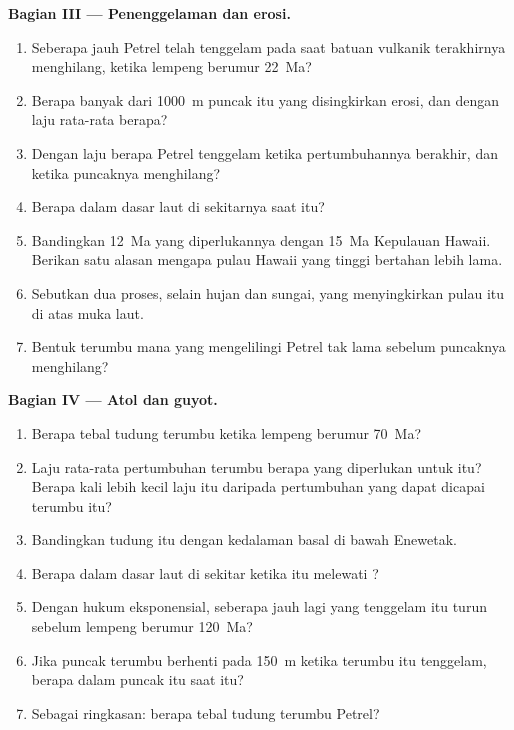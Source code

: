 \begin{problem}
\noindent\textbf{Bagian III --- Penenggelaman dan erosi.}
\begin{enumerate}[resume]
  \item Seberapa jauh Petrel telah tenggelam pada saat batuan vulkanik terakhirnya menghilang, ketika lempeng
        berumur \qty{22}{Ma}?
  \item Berapa banyak dari \qty{1000}{m} puncak itu yang disingkirkan erosi, dan dengan laju rata-rata berapa?
  \item Dengan laju berapa Petrel tenggelam ketika pertumbuhannya berakhir, dan ketika puncaknya menghilang?
  \item Berapa dalam dasar laut di sekitarnya saat itu?
  \item Bandingkan \qty{12}{Ma} yang diperlukannya dengan \qty{15}{Ma} Kepulauan Hawaii. Berikan satu
        alasan mengapa pulau Hawaii yang tinggi bertahan lebih lama.
  \item Sebutkan dua proses, selain hujan dan sungai, yang menyingkirkan pulau itu di atas muka laut.
  \item Bentuk terumbu mana yang mengelilingi Petrel tak lama sebelum puncaknya menghilang?
\end{enumerate}

\noindent\textbf{Bagian IV --- Atol dan guyot.}
\begin{enumerate}[resume]
  \item Berapa tebal tudung terumbu ketika lempeng berumur \qty{70}{Ma}?
  \item Laju rata-rata pertumbuhan terumbu berapa yang diperlukan untuk itu? Berapa kali lebih kecil laju itu daripada pertumbuhan
        yang dapat dicapai terumbu itu?
  \item Bandingkan tudung itu dengan kedalaman basal di bawah Enewetak.
  \item Berapa dalam dasar laut di sekitar  ketika  itu melewati ?
  \item Dengan hukum eksponensial, seberapa jauh lagi  yang tenggelam itu turun sebelum lempeng berumur
        \qty{120}{Ma}?
  \item Jika puncak terumbu berhenti pada \qty{150}{m} ketika terumbu itu tenggelam, berapa dalam puncak
         itu saat itu?
  \item Sebagai ringkasan: berapa tebal tudung terumbu  Petrel?
\end{enumerate}
\end{problem}
